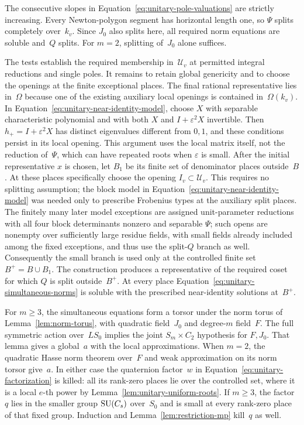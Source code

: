 The consecutive slopes in Equation~\eqref{eq:unitary-pole-valuations}
are strictly increasing.  Every Newton-polygon segment has horizontal
length one, so $\Psi$ splits completely over~$k_v$.  Since $J_0$
also splits here, all required norm equations are soluble and~$Q$
splits.  For $m=2$, splitting of~$J_0$ alone suffices.

The tests establish the required membership in~$\mathcal U_v$ at
permitted integral reductions and single poles.  It remains to
retain global genericity and to choose the openings at the finite
exceptional places.  The final rational representative lies
in~$\Omega$ because one of the existing auxiliary local openings is
contained in~$\Omega(k_v)$.  In
Equation~\eqref{eq:unitary-near-identity-model}, choose $X$ with
separable characteristic polynomial and with both $X$ and
$I+\varepsilon^2X$ invertible.  Then $h_+=I+\varepsilon^2X$ has
distinct eigenvalues different from $0,1$, and these conditions
persist in its local opening.  This argument uses the local matrix
itself, not the reduction of~$\Psi$, which can have repeated roots
when $\varepsilon$ is small.
After the initial representative $x$ is chosen, let $B_1$ be its
finite set of denominator places outside~$B$.  At these places
specifically choose the opening $I_v\subset\mathcal U_v$.
This requires no splitting assumption; the block model in
Equation~\eqref{eq:unitary-near-identity-model} was needed only to
prescribe Frobenius types at the auxiliary split places.  The finitely
many later model exceptions are assigned unit-parameter
reductions with all four block determinants nonzero and separable
$\Psi$; such opens are nonempty over sufficiently large residue
fields, with small fields already included among the fixed
exceptions, and thus use the split-$Q$ branch as well.  Consequently
the small branch is used only at the controlled finite set
$B^+=B\cup B_1$.  The construction produces a representative of
the required coset for which $Q$ is split outside~$B^+$.
At every place Equation~\eqref{eq:unitary-simultaneous-norms} is
soluble with the prescribed near-identity solutions at~$B^+$.

For $m\geq3$, the simultaneous equations form a torsor under the
norm torus of Lemma~\ref{lem:norm-torus}, with quadratic field~$J_0$
and degree-$m$ field~$F$.  The full symmetric action over~$LS_0$
implies the joint $S_m\times C_2$ hypothesis for $F,J_0$.  That lemma
gives a global~$a$ with the local approximations.  When $m=2$, the
quadratic Hasse norm theorem over~$F$
\cite[Chapter~VIII, Theorem~3.1]{MilneCFT} and weak approximation on its
norm torsor give~$a$.  In either case the quaternion factor~$w$ in
Equation~\eqref{eq:unitary-factorization} is killed: all its
rank-zero places lie over the controlled set, where it is a local
$e$-th power by Lemma~\ref{lem:unitary-uniform-roots}.  If $m\geq3$,
the factor $q$ lies in the smaller group $\operatorname{SU}(C_s)$ over~$S_0$ and is
small at every rank-zero place of that fixed group.  Induction and
Lemma~\ref{lem:restriction-mp} kill~$q$ as well.

